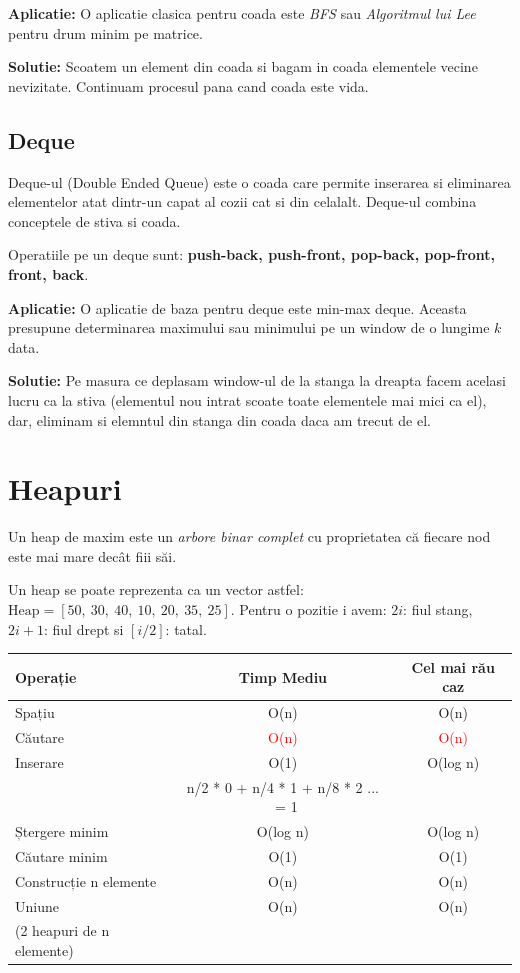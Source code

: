 \documentclass[11pt,a4paper]{article}
\theoremstyle{definition}
\theoremstyle{plain}
\theoremstyle{remark}
\begin{document}
\textbf{Aplicatie:}
O aplicatie clasica pentru coada este \textit{BFS} sau \textit{Algoritmul lui Lee} pentru drum minim pe matrice. 

\textbf{Solutie:}
Scoatem un element din coada si bagam in coada elementele vecine nevizitate. Continuam procesul pana cand coada este vida.

\subsection{Deque}
Deque-ul (Double Ended Queue) este o coada care permite inserarea si eliminarea elementelor atat dintr-un capat al cozii cat si din celalalt. Deque-ul combina conceptele de stiva si coada.

Operatiile pe un deque sunt: \textbf{push-back, push-front, pop-back, pop-front, front, back}.

\textbf{Aplicatie:}
O aplicatie de baza pentru deque este min-max deque. Aceasta presupune determinarea maximului sau minimului pe un window de o lungime $k$ data.

\textbf{Solutie:}
Pe masura ce deplasam window-ul de la stanga la dreapta facem acelasi lucru ca la stiva (elementul nou intrat scoate toate elementele mai mici ca el), dar, eliminam si elemntul din stanga din coada daca am trecut de el.


\section{Heapuri}
Un heap de maxim este un \textit{arbore binar complet} cu proprietatea că fiecare nod este mai mare decât fiii săi.

Un heap se poate reprezenta ca un vector astfel:
$\text{Heap} = [50,\ 30,\ 40,\ 10,\ 20,\ 35,\ 25]$. Pentru o pozitie i avem: $2i$: fiul stang, $2i+1$: fiul drept si $[i/2]$: tatal.

\begin{tabular}{|l|c|c|}
\hline
\textbf{Operație} & \textbf{Timp Mediu} & \textbf{Cel mai rău caz} \\
\hline
Spațiu & O(n) & O(n) \\
\hline
Căutare & \textcolor{red}{O(n)} & \textcolor{red}{O(n)} \\
\hline
Inserare & O(1) & O(log n) \\
 & n/2 * 0 + n/4 * 1 + n/8 * 2 ... ~= 1 & \\
\hline
Ștergere minim & O(log n) & O(log n) \\
\hline
Căutare minim & O(1) & O(1) \\
\hline
Construcție n elemente & O(n) & O(n) \\
\hline
Uniune & O(n) & O(n) \\
(2 heapuri de n elemente) & & \\
\hline
\end{tabular}
\end{document}
